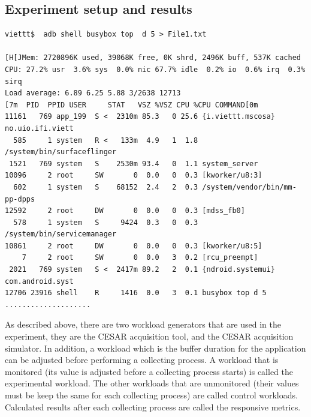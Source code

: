 \subsection{Experiment setup and results}
\begin{minipage}{\linewidth}
\begin{lstlisting}[caption={A sample of five seconds fragment ouput from the command}, label = {listing:BUSYBOXTOP}, captionpos=b, basicstyle=\ttfamily\footnotesize]
viettt$  adb shell busybox top  d 5 > File1.txt

[H[JMem: 2720896K used, 39068K free, 0K shrd, 2496K buff, 537K cached
CPU: 27.2% usr  3.6% sys  0.0% nic 67.7% idle  0.2% io  0.6% irq  0.3% sirq
Load average: 6.89 6.25 5.88 3/2638 12713
[7m  PID  PPID USER     STAT   VSZ %VSZ CPU %CPU COMMAND[0m
11161   769 app_199  S <  2310m 85.3   0 25.6 {i.viettt.mscosa} no.uio.ifi.viett
  585     1 system   R <   133m  4.9   1  1.8 /system/bin/surfaceflinger
 1521   769 system   S    2530m 93.4   0  1.1 system_server
10096     2 root     SW       0  0.0   0  0.3 [kworker/u8:3]
  602     1 system   S    68152  2.4   2  0.3 /system/vendor/bin/mm-pp-dpps
12592     2 root     DW       0  0.0   0  0.3 [mdss_fb0]
  578     1 system   S     9424  0.3   0  0.3 /system/bin/servicemanager
10861     2 root     DW       0  0.0   0  0.3 [kworker/u8:5]
    7     2 root     SW       0  0.0   3  0.2 [rcu_preempt]
 2021   769 system   S <  2417m 89.2   2  0.1 {ndroid.systemui} com.android.syst
12706 23916 shell    R     1416  0.0   3  0.1 busybox top d 5
....................
\end{lstlisting}
\end{minipage}
As described above, there are two workload generators that are used in the experiment, they are the CESAR acquisition tool, and the CESAR acquisition simulator. In addition, a workload which is the buffer duration for the application can be adjusted before performing a collecting process. A workload that is monitored (its value is adjusted before a collecting process starts) is called the experimental workload. The other workloads that are unmonitored (their values must be keep the same for each collecting process) are called control workloads. Calculated results after each collecting process are called the responsive metrics.\\
